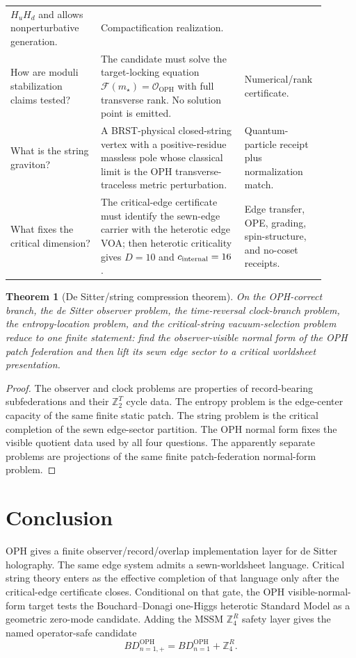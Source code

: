 \documentclass[11pt]{article}
\newtheorem{theorem}{Theorem}[section]
\theoremstyle{remark}
\theoremstyle{plain}
\newcommand{\OPH}{\mathrm{OPH}}
\newcommand{\Z}{\mathbb Z}
\newcommand{\calF}{\mathcal F}
\newcommand{\calO}{\mathcal O}
\newcommand{\ZfourR}{\mathbb Z_4^R}
\begin{document}
\begin{longtable}{p{0.27\linewidth}p{0.43\linewidth}p{0.20\linewidth}}
\(H_uH_d\) and allows nonperturbative generation. & Compactification realization. \\
How are moduli stabilization claims tested? & The candidate must solve the target-locking equation
\(\calF(m_\star)=\calO_{\OPH}\) with full transverse rank. No solution point is emitted. &
Numerical/rank certificate. \\
What is the string graviton? & A BRST-physical closed-string vertex with a positive-residue
massless pole whose classical limit is the OPH transverse-traceless metric perturbation. &
Quantum-particle receipt plus normalization match. \\
What fixes the critical dimension? & The critical-edge certificate must identify the sewn-edge carrier
with the heterotic edge VOA; then heterotic criticality gives \(D=10\) and
\(c_{\rm internal}=16\). & Edge transfer, OPE, grading, spin-structure, and no-coset receipts. \\
\bottomrule
\end{longtable}

\begin{theorem}[De Sitter/string compression theorem]
On the OPH-correct branch, the de Sitter observer problem, the time-reversal clock-branch
problem, the entropy-location problem, and the critical-string vacuum-selection problem reduce to
one finite statement: find the observer-visible normal form of the OPH patch federation and then
lift its sewn edge sector to a critical worldsheet presentation.
\end{theorem}

\begin{proof}
The observer and clock problems are properties of record-bearing subfederations and their
\(\Z_2^T\) cycle data. The entropy problem is the edge-center capacity of the same finite static
patch. The string problem is the critical completion of the sewn edge-sector partition. The OPH
normal form fixes the visible quotient data used by all four questions. The apparently separate
problems are projections of the same finite patch-federation normal-form problem.
\end{proof}

\section{Conclusion}

OPH gives a finite observer/record/overlap implementation layer for de Sitter holography. The
same edge system admits a sewn-worldsheet language. Critical string theory enters as the
effective completion of that language only after the critical-edge certificate closes. Conditional on
that gate, the OPH visible-normal-form target tests the
Bouchard--Donagi one-Higgs heterotic Standard Model as a geometric zero-mode candidate. Adding the MSSM
\(\ZfourR\) safety layer gives the named operator-safe candidate
\[
BD_{n=1,+}^{\OPH}=BD_{n=1}^{\OPH}+\ZfourR.
\]
\end{document}
